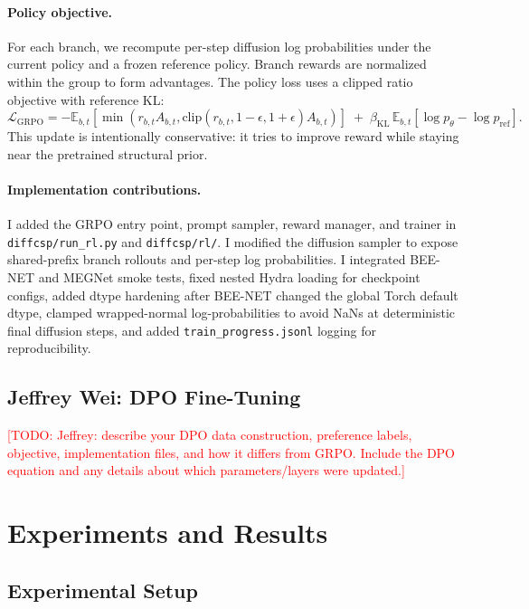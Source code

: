 \documentclass{article}
\newcommand{\todo}[1]{\textcolor{red}{[TODO: #1]}}
\begin{document}
\paragraph{Policy objective.}
For each branch, we recompute per-step diffusion log probabilities under the current policy and a frozen reference policy. Branch rewards are normalized within the group to form advantages. The policy loss uses a clipped ratio objective with reference KL:
\begin{equation}
\mathcal{L}_{\mathrm{GRPO}}
=-\mathbb{E}_{b,t}\left[
\min(r_{b,t}A_{b,t},
\mathrm{clip}(r_{b,t},1-\epsilon,1+\epsilon)A_{b,t})
\right]
\;+\;\beta_{\mathrm{KL}}\,
\mathbb{E}_{b,t}\left[\log p_\theta-\log p_{\mathrm{ref}}\right].
\end{equation}
This update is intentionally conservative: it tries to improve reward while staying near the pretrained structural prior.

\paragraph{Implementation contributions.}
I added the GRPO entry point, prompt sampler, reward manager, and trainer in \texttt{diffcsp/run\_rl.py} and \texttt{diffcsp/rl/}. I modified the diffusion sampler to expose shared-prefix branch rollouts and per-step log probabilities. I integrated BEE-NET and MEGNet smoke tests, fixed nested Hydra loading for checkpoint configs, added dtype hardening after BEE-NET changed the global Torch default dtype, clamped wrapped-normal log-probabilities to avoid NaNs at deterministic final diffusion steps, and added \texttt{train\_progress.jsonl} logging for reproducibility.

\subsection{Jeffrey Wei: DPO Fine-Tuning}
\todo{Jeffrey: describe your DPO data construction, preference labels, objective, implementation files, and how it differs from GRPO. Include the DPO equation and any details about which parameters/layers were updated.}

\section{Experiments and Results}
\subsection{Experimental Setup}
\end{document}
